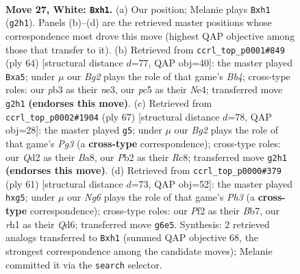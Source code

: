 \documentclass[11pt]{article}
\begin{document}
\clearpage

\begin{figure}[p]\centering
\begin{subfigure}{0.46\textwidth}\centering
\resizebox{\linewidth}{!}{%
\newchessgame
\chessboard[
  setfen={4k3/4q3/6N1/2pp1p2/3n2b1/1p6/1P1QPPB1/K3B2r w - - 0 27},
  showmover=false,
  pgfstyle=straightmove, color=movearrow, markmove={g2-h1}
]}
\caption{}
\end{subfigure}\hfill
\begin{subfigure}{0.46\textwidth}\centering
\resizebox{\linewidth}{!}{%
\newchessgame
\chessboard[
  setfen={3q3k/2p3bn/3pB1p1/rP1Pp1P1/1B2N3/4n2Q/8/6K1 w - - 0 33},
  showmover=false,
  pgfstyle=straightmove, color=movearrow, markmove={b4-a5}
]}
\caption{}
\end{subfigure}
\\[4pt]
\begin{subfigure}{0.46\textwidth}\centering
\resizebox{\linewidth}{!}{%
\newchessgame
\chessboard[
  setfen={b1r5/p4p1k/6p1/5P2/P2Np2q/4P2P/6QK/1R6 b - - 0 34},
  showmover=false,
  pgfstyle=straightmove, color=movearrow, markmove={g6-g5}
]}
\caption{}
\end{subfigure}\hfill
\begin{subfigure}{0.46\textwidth}\centering
\resizebox{\linewidth}{!}{%
\newchessgame
\chessboard[
  setfen={3k4/1b6/p2q1b1p/1p4R1/8/PN1B4/1PP4P/1K1Q4 b - - 0 31},
  showmover=false,
  pgfstyle=straightmove, color=movearrow, markmove={h6-g5}
]}
\caption{}
\end{subfigure}
\caption{\textbf{Move 27, White: \texttt{Bxh1}.} (a) Our position; Melanie plays \texttt{Bxh1} (\texttt{g2h1}). Panels (b)--(d) are the retrieved master positions whose correspondence most drove this move (highest QAP objective among those that transfer to it). (b) Retrieved from \texttt{ccrl\_top\_p0001\#849} (ply 64) [structural distance $d$=77, QAP obj=40]: the master played \texttt{Bxa5}; under $\mu$ our \emph{Bg2} plays the role of that game's \emph{Bb4}; cross-type roles: our \emph{p}b3 as their \emph{n}e3, our \emph{p}c5 as their \emph{N}e4; transferred move \texttt{g2h1} \textbf{(endorses this move)}. (c) Retrieved from \texttt{ccrl\_top\_p0002\#1904} (ply 67) [structural distance $d$=78, QAP obj=28]: the master played \texttt{g5}; under $\mu$ our \emph{Bg2} plays the role of that game's \emph{Pg3} (a \textbf{cross-type} correspondence); cross-type roles: our \emph{Q}d2 as their \emph{B}a8, our \emph{P}b2 as their \emph{R}c8; transferred move \texttt{g2h1} \textbf{(endorses this move)}. (d) Retrieved from \texttt{ccrl\_top\_p0000\#379} (ply 61) [structural distance $d$=73, QAP obj=52]: the master played \texttt{hxg5}; under $\mu$ our \emph{Ng6} plays the role of that game's \emph{Ph3} (a \textbf{cross-type} correspondence); cross-type roles: our \emph{P}f2 as their \emph{B}b7, our \emph{r}h1 as their \emph{Q}d6; transferred move \texttt{g6e5}. Synthesis: 2 retrieved analogs transferred to \texttt{Bxh1} (summed QAP objective 68, the strongest correspondence among the candidate moves); Melanie committed it via the \texttt{search} selector.}
\label{fig:thought-m52}
\end{figure}
\end{document}
